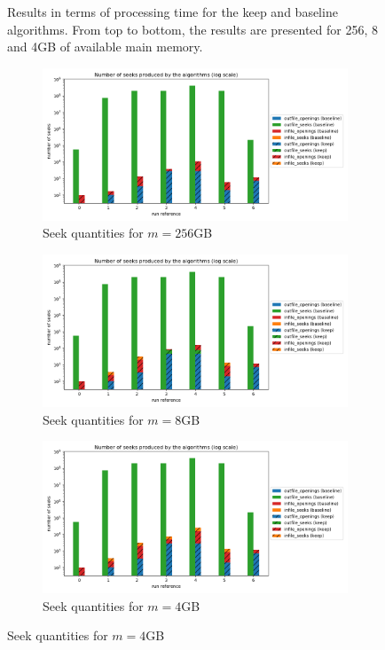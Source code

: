 \documentclass[sigconf, nonacm]{acmart}
\begin{document}
{\begin{figure}
     \caption{Results in terms of processing time for the keep and baseline algorithms. From top to bottom, the results are presented for 256, 8 and 4GB of available main memory.}
     \label{fig:results}

\end{figure}

\begin{figure}
     \centering
     \begin{subfigure}[b]{\textwidth}
         \centering
         \includegraphics[scale=0.5]{./figures/new/results_seeks_256.png}
         \caption{Seek quantities for $m=256$GB}
         \label{fig:seeks256}
     \end{subfigure}
     \vfill
     \begin{subfigure}[b]{\textwidth}
         \centering
         \includegraphics[scale=0.5]{./figures/new/results_seeks_8.png}
         \caption{Seek quantities for $m=8$GB}
         \label{fig:seeks8}
     \end{subfigure}
     \vfill
     \begin{subfigure}[b]{\textwidth}
         \centering
         \includegraphics[scale=0.5]{./figures/new/results_seeks_4.png}
         \caption{Seek quantities for $m=4$GB}
         \label{fig:seeks4}
     \end{subfigure}


\end{figure}}
\end{document}
